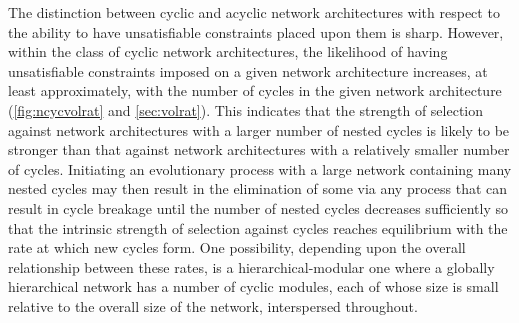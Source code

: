 The distinction between cyclic and acyclic network architectures with respect to the ability to have unsatisfiable constraints placed upon them is sharp. However, within the class of cyclic network architectures, the likelihood of having unsatisfiable constraints imposed on a given network architecture increases, at least approximately, with the number of cycles in the given network architecture (\autoref{fig:ncycvolrat} and \autoref{sec:volrat}). This indicates that the strength of selection against network architectures with a larger number of nested cycles is likely to be stronger than that against network architectures with a relatively smaller number of cycles. Initiating an evolutionary process with a large network containing many nested cycles may then result in the elimination of some via any process that can result in cycle breakage until the number of nested cycles decreases sufficiently so that the intrinsic strength of selection against cycles reaches equilibrium with the rate at which new cycles form. One possibility, depending upon the overall relationship between these rates, is a hierarchical-modular one where a globally hierarchical network has a number of cyclic modules, each of whose size is small relative to the overall size of the network, interspersed throughout.
